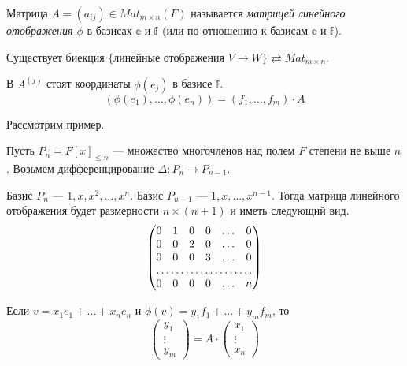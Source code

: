 \begin{Def}
Матрица $A = (a_{ij}) \in Mat_{m \times n}(F)$ называется \textit{матрицей линейного отображения $\phi$} в базисах $\mathbb{e}$ и $\mathbb{f}$ (или по отношению к базисам $\mathbb{e}$ и $\mathbb{f}$).
\end{Def}

\begin{Comment}
Существует биекция $\{\text{линейные отображения } V \rightarrow W \} \rightleftarrows Mat_{m\times n}$.
\end{Comment}

\begin{Comment}
В $A^{(j)}$ стоят координаты $\phi(e_j)$ в базисе $\mathbb{f}$.
\[
(\phi(e_1), \ldots, \phi(e_n)) = (f_1, \ldots, f_m)\cdot A
\]
\end{Comment}

Рассмотрим пример.

Пусть $P_n = F[x]_{\leqslant n}$ --- множество многочленов над полем $F$ степени не выше $n$. Возьмем дифференцирование $\Delta: P_n \rightarrow P_{n-1}$.

Базис $P_n$ --- $1, x, x^2, \ldots, x^n$. Базис $P_{n-1}$ --- $1, x, \ldots, x^{n-1}$. Тогда матрица линейного отображения будет размерности $n \times (n+1)$ и иметь следующий вид.
\[
\begin{pmatrix*}
0 & 1 & 0 & 0 & \dots & 0 \\
0 & 0 & 2 & 0 & \dots & 0 \\
0 & 0 & 0 & 3 & \dots & 0 \\
\hdotsfor{6} \\
0 & 0 & 0 & 0 & \dots & n
\end{pmatrix*}
\] 

\begin{Suggestion}
Если $v = x_1 e_1 + \ldots + x_ne_n$ и $\phi(v) = y_1f_1 + \ldots + y_mf_m$, то 
\[
\begin{pmatrix*}
y_1 \\
\vdots \\
y_m
\end{pmatrix*}
= A \cdot
\begin{pmatrix*}
x_1 \\
\vdots \\
x_n
\end{pmatrix*}
\]
\end{Suggestion}

